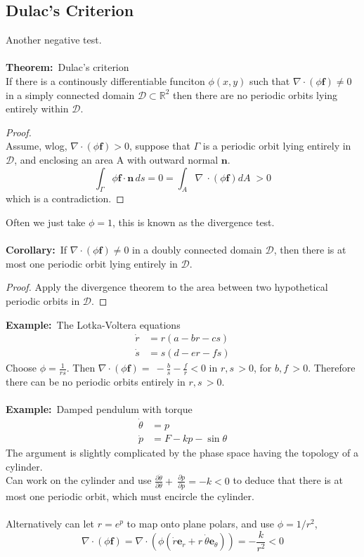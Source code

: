 \documentclass{article}
\newcommand{\domain}{\mathcal{D}}                           %
\newcommand{\example}{\textbf{Example:}}                    %
\newcommand{\theorem}{\textbf{Theorem:}}                    %
\newcommand{\corollary}{\textbf{Corollary:}}                %
\begin{document}
\subsection{Dulac's Criterion}
Another negative test.
\\
\\
\theorem\ Dulac's criterion
\\
If there is a continously differentiable funciton $\phi(x,y)$ such that
$\nabla \cdot ( \phi \bm{f}) \neq 0$ in a simply connected domain 
$\domain \subset \mathbb{R}^2$ then there are no periodic orbits lying
entirely within $\domain$.
\begin{proof} ~
\\
Assume, wlog, $\nabla \cdot ( \phi \bm{f} ) > 0$, suppose that $\Gamma$ is
a periodic orbit lying entirely in $\domain$, and enclosing an area A with
outward normal $\bm{n}$.
\[ \int_{\Gamma} \phi \bm{f} \cdot \bm{n} \, ds = 0 = \int_{A} \nabla \
\cdot ( \phi \bm{f} ) dA \; >0 \]
which is a contradiction.
\end{proof}
%
\noindent Often we just take $\phi = 1$, this is known as the divergence test.
\\
\\
\corollary\ If $\nabla \cdot ( \phi \bm{f}) \neq 0 $ in a doubly connected
domain $\domain$, then there is at most one periodic orbit lying entirely in
$\domain$.
\begin{proof}
Apply the divergence theorem to the area between two hypothetical periodic 
orbits in $\domain$.
\end{proof}
\noindent
\example\   The Lotka-Voltera equations
\begin{align*}
\dot{r} &= r(a - br -cs) \\
\dot{s} &= s(d - er -fs)
\end{align*}
Choose $\phi = \frac{1}{rs}$. Then $\nabla \cdot ( \phi \bm{f}) = \
-\frac{b}{s} - \frac{f}{r} <0$ in $r,s \, >0$, for $b,f \, >0$.
Therefore there can be no periodic orbits entirely in $r,s \, > 0$.
\\
\\
\example\ Damped pendulum with torque
\\
\begin{align*}
\dot{\theta} &= p \\
\dot{p}      &= F - kp - \sin \theta
\end{align*}
The argument is slightly complicated by the phase space having the topology 
of a cylinder.
\\
Can work on the cylinder and use $\frac{\partial \dot{\theta}}{\partial \theta} +\
\frac{\partial \dot{p}}{\partial p} = -k <0$ to deduce that there is at most one
periodic orbit, which must encircle the cylinder.
\\
\\
Alternatively can let $r = e^p$ to map onto plane polars, and use $\phi = 1/r^2$,
\[ \nabla \cdot (\phi \bm{f}) = \nabla \cdot ( \phi( \dot{r} \bm{e}_r + r \
\dot{\theta} \bm{e}_{\theta})) = -\frac{k}{r^2} < 0\]
\\
\\
\end{document}
